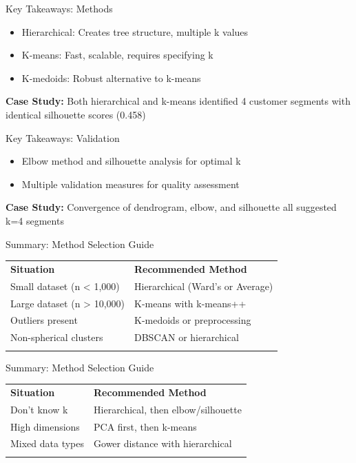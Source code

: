 \documentclass[aspectratio=169,ignorenonframetext]{beamer}
\begin{document}
\begin{frame}{Key Takeaways: Methods}
\begin{itemize}
\item
  Hierarchical: Creates tree structure, multiple k values
\item
  K-means: Fast, scalable, requires specifying k
\item
  K-medoids: Robust alternative to k-means
\end{itemize}

\textbf{Case Study:} Both hierarchical and k-means identified 4 customer
segments with identical silhouette scores (0.458)
\end{frame}

\begin{frame}{Key Takeaways: Validation}
\begin{itemize}
\item
  Elbow method and silhouette analysis for optimal k
\item
  Multiple validation measures for quality assessment
\end{itemize}

\textbf{Case Study:} Convergence of dendrogram, elbow, and silhouette
all suggested k=4 segments
\end{frame}

\begin{frame}{Summary: Method Selection Guide}
{\def\LTcaptype{none} %
\begin{longtable}[]{@{}
  >{\raggedright\arraybackslash}p{}
  >{\raggedright\arraybackslash}p{}@{}}
\toprule\noalign{}
\endhead
\textbf{Situation} & \textbf{Recommended Method} \\
Small dataset (n \textless{} 1,000) & Hierarchical (Ward's or
Average) \\
Large dataset (n \textgreater{} 10,000) & K-means with k-means++ \\
Outliers present & K-medoids or preprocessing \\
Non-spherical clusters & DBSCAN or hierarchical \\
\bottomrule\noalign{}
\end{longtable}
}
\end{frame}

\begin{frame}{Summary: Method Selection Guide}
{\def\LTcaptype{none} %
\begin{longtable}[]{@{}
  >{\raggedright\arraybackslash}p{}
  >{\raggedright\arraybackslash}p{}@{}}
\toprule\noalign{}
\endhead
\textbf{Situation} & \textbf{Recommended Method} \\
Don't know k & Hierarchical, then elbow/silhouette \\
High dimensions & PCA first, then k-means \\
Mixed data types & Gower distance with hierarchical \\
\bottomrule\noalign{}
\end{longtable}
}
\end{frame}
\end{document}
